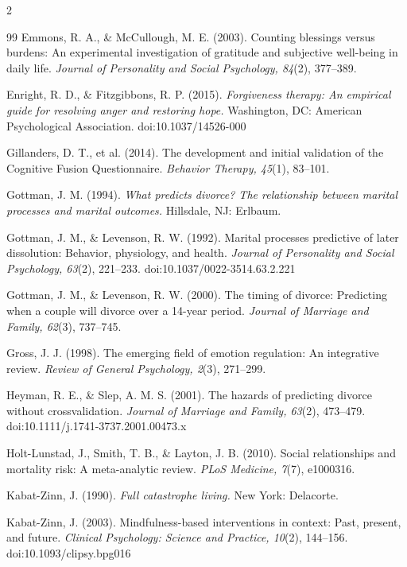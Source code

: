 \documentclass[10pt]{article}
\theoremstyle{definition}
\theoremstyle{remark}
\begin{document}
\begin{multicols}{2}
\begin{thebibliography}{99}
Emmons, R. A., \& McCullough, M. E. (2003). Counting blessings versus burdens: An experimental investigation of gratitude and subjective well-being in daily life. \emph{Journal of Personality and Social Psychology, 84}(2), 377--389.

Enright, R. D., \& Fitzgibbons, R. P. (2015). \emph{Forgiveness therapy: An empirical guide for resolving anger and restoring hope.} Washington, DC: American Psychological Association. doi:10.1037/14526-000

Gillanders, D. T., et al. (2014). The development and initial validation of the Cognitive Fusion Questionnaire. \emph{Behavior Therapy, 45}(1), 83--101.

Gottman, J. M. (1994). \emph{What predicts divorce? The relationship between marital processes and marital outcomes.} Hillsdale, NJ: Erlbaum.

Gottman, J. M., \& Levenson, R. W. (1992). Marital processes predictive of later dissolution: Behavior, physiology, and health. \emph{Journal of Personality and Social Psychology, 63}(2), 221--233. doi:10.1037/0022-3514.63.2.221

Gottman, J. M., \& Levenson, R. W. (2000). The timing of divorce: Predicting when a couple will divorce over a 14-year period. \emph{Journal of Marriage and Family, 62}(3), 737--745.

Gross, J. J. (1998). The emerging field of emotion regulation: An integrative review. \emph{Review of General Psychology, 2}(3), 271--299.

Heyman, R. E., \& Slep, A. M. S. (2001). The hazards of predicting divorce without crossvalidation. \emph{Journal of Marriage and Family, 63}(2), 473--479. doi:10.1111/j.1741-3737.2001.00473.x

Holt-Lunstad, J., Smith, T. B., \& Layton, J. B. (2010). Social relationships and mortality risk: A meta-analytic review. \emph{PLoS Medicine, 7}(7), e1000316.

Kabat-Zinn, J. (1990). \emph{Full catastrophe living.} New York: Delacorte.

Kabat-Zinn, J. (2003). Mindfulness-based interventions in context: Past, present, and future. \emph{Clinical Psychology: Science and Practice, 10}(2), 144--156. doi:10.1093/clipsy.bpg016


\end{thebibliography}
\end{multicols}
\end{document}
